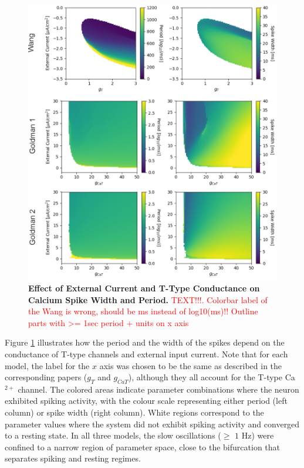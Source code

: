 \documentclass[../main.tex]{subfiles}
\begin{document}
\begin{figure}[!t]
    \centering
    \includegraphics[width=0.9\linewidth]{../img/ttx_block/ttx_block.png}
    \caption[Effect of External Current and T-Type Conductance on Calcium Spike Width and Period]{
        \textbf{Effect of External Current and T-Type Conductance on Calcium Spike Width and Period.} \textcolor{red}{TEXT!!!. Colorbar label of the Wang is wrong, should be ms instead of log10(ms)!! Outline parts with >= 1sec period + units on x axis}
    }
    \label{fig:models_ttx_block}
\end{figure}

Figure \ref{fig:models_ttx_block} illustrates how the period and the width of the spikes depend on the conductance of T-type channels and external input current. Note that for each model, the label for the $x$ axis was chosen to be the same as described in the corresponding papers ($g_T$ and $g_{CaT}$), although they all account for the T-type Ca$^{2+}$ channel. The colored areas indicate parameter combinations where the neuron exhibited spiking activity, with the colour scale representing either period (left column) or spike width (right column). White regions correspond to the parameter values where the system did not exhibit spiking activity and converged to a resting state. In all three models, the slow oscillations ($\geq$ $1$ Hz) were confined to a narrow region of parameter space, close to the bifurcation that separates spiking and resting regimes.
\end{document}

